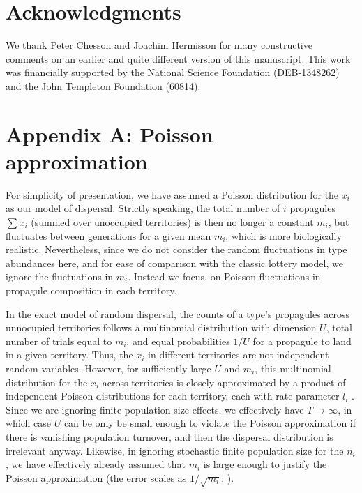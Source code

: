\documentclass[11pt]{article}
\begin{document}
\section*{Acknowledgments}

We thank Peter Chesson and Joachim Hermisson for many constructive comments on an earlier and quite different version of this manuscript. This work was financially supported by the National Science Foundation (DEB-1348262) and the John Templeton Foundation (60814).


 

\section*{Appendix A: Poisson approximation}

For simplicity of presentation, we have assumed a Poisson distribution for the $x_i$ as our model of dispersal. Strictly speaking, the total number of $i$ propagules $\sum x_i$ (summed over unoccupied territories) is then no longer a constant $m_i$, but fluctuates between generations for a given mean $m_i$, which is more biologically realistic. Nevertheless, since we do not consider the random fluctuations in type abundances here, and for ease of comparison with the classic lottery model, we ignore the fluctuations in $m_i$. Instead we focus, on Poisson fluctuations in propagule composition in each territory. 

In the exact model of random dispersal, the counts of a type's propagules across unnocupied territories follows a multinomial distribution with dimension $U$, total number of trials equal to $m_i$, and equal probabilities $1/U$ for a propagule to land in a given territory. Thus, the $x_i$ in different territories are not independent random variables. However, for sufficiently large $U$ and $m_i$, this multinomial distribution for the $x_i$ across territories is closely approximated by a product of independent Poisson distributions for each territory, each with rate parameter $l_i$ \citep[Theorem 1]{arenbaev_1977}. Since we are ignoring finite population size effects, we effectively have $T\rightarrow \infty$, in which case $U$ can be only be small enough to violate the Poisson approximation if there is vanishing population turnover, and then the dispersal distribution is irrelevant anyway. Likewise, in ignoring stochastic finite population size for the $n_i$, we have effectively already assumed that $m_i$ is large enough to justify the Poisson approximation (the error scales as $1/\sqrt{m_i}$; \citealt{arenbaev_1977}).
\end{document}
